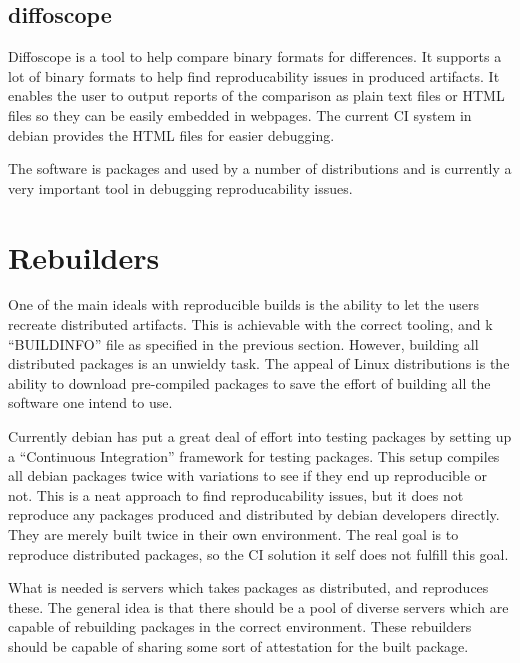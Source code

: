 \documentclass[../Main/thesis.tex]{subfiles}
\begin{document}
\subsection*{diffoscope}
Diffoscope is a tool to help compare binary formats for differences. It supports
a lot of binary formats to help find reproducability issues in produced
artifacts. It enables the user to output reports of the comparison as plain text
files or HTML files so they can be easily embedded in webpages. The current CI
system in debian provides the HTML files for easier debugging.

The software is packages and used by a number of distributions and is currently
a very important tool in debugging reproducability issues.


\section{Rebuilders}\label{sec:rebuilders} 
One of the main ideals with reproducible builds is the ability to let the users
recreate distributed artifacts. This is achievable with the correct tooling, and
k ``BUILDINFO'' file as specified in the previous section. However, building all
distributed packages is an unwieldy task. The appeal of Linux distributions is
the ability to download pre-compiled packages to save the effort of building all
the software one intend to use.


Currently debian has put a great deal of effort into testing packages by setting
up a ``Continuous Integration'' framework for testing packages. This setup
compiles all debian packages twice with variations to see if they end up
reproducible or not. This is a neat approach to find reproducability issues, but
it does not reproduce any packages produced and distributed by debian developers
directly. They are merely built twice in their own environment. The real goal is
to reproduce distributed packages, so the CI solution it self does not fulfill
this goal.

What is needed is servers which takes packages as distributed, and reproduces
these. The general idea is that there should be a pool of diverse servers which
are capable of rebuilding packages in the correct environment. These rebuilders
should be capable of sharing some sort of attestation for the built package.

\end{document}
